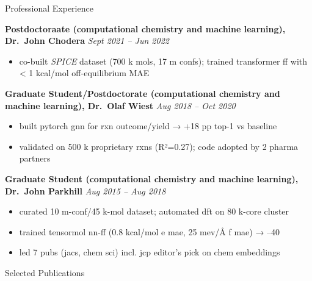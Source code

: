 \documentclass{resume} %
\begin{document}
\begin{rSection}{Professional Experience}

\textbf{Postdoctoraate (computational chemistry and machine learning), Dr.\ John Chodera} \hfill \emph{Sept 2021 -- Jun 2022}
\vspace{-0.4em}
\begin{itemize}\itemsep -0.4em
  \item co-built \emph{SPICE} dataset (700 k mols, 17 m confs); trained transformer ff with < 1 kcal/mol off-equilibrium MAE
\end{itemize}

\textbf{Graduate Student/Postdoctorate (computational chemistry and machine learning), Dr.\ Olaf Wiest} \hfill \emph{Aug 2018 -- Oct 2020}
\vspace{-0.4em}
\begin{itemize}\itemsep -0.4em
  \item built pytorch gnn for rxn outcome/yield → +18 pp top-1 vs baseline
  \item validated on 500 k proprietary rxns (R²=0.27); code adopted by 2 pharma partners
\end{itemize}

\textbf{Graduate Student (computational chemistry and machine learning), Dr.\ John Parkhill} \hfill \emph{Aug 2015 -- Aug 2018}
\vspace{-0.4em}
\begin{itemize}\itemsep -0.4em
  \item curated 10 m-conf/45 k-mol dataset; automated dft on 80 k-core cluster
  \item trained tensormol nn-ff (0.8 kcal/mol e mae, 25 mev/Å f mae) → –40 %
  \item led 7 pubs (jacs, chem sci) incl. jcp editor’s pick on chem embeddings
\end{itemize}

\end{rSection}

\begin{rSection}{Selected Publications}

\item {}
\item {}
\item {}

\end{rSection}

\clearpage
\end{document}
